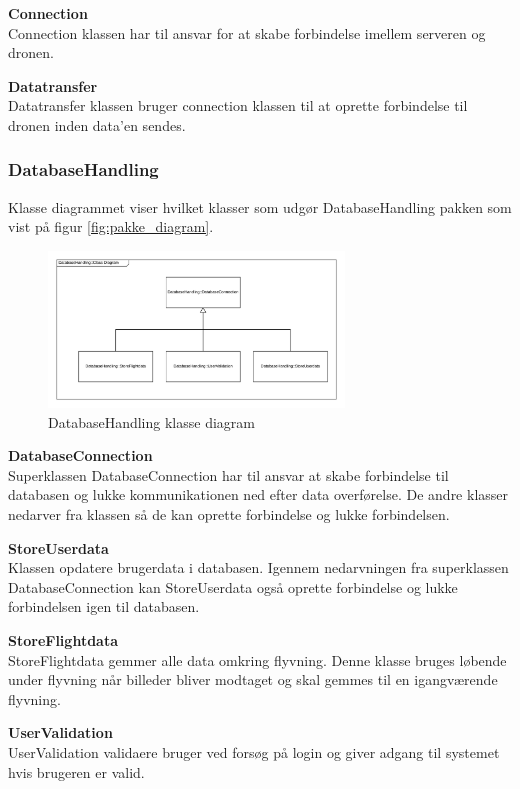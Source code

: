 \textbf{Connection}\\
Connection klassen har til ansvar for at skabe forbindelse imellem serveren og dronen.

\textbf{Datatransfer}\\
Datatransfer klassen bruger connection klassen til at oprette forbindelse til dronen inden data'en sendes. 

\newpage
\subsubsection*{DatabaseHandling}
Klasse diagrammet viser hvilket klasser som udgør DatabaseHandling pakken som vist på figur \ref{fig:pakke_diagram}.

\vspace{-5pt}
\begin{figure}[H]
	\centering
	\includegraphics[width=0.7\textwidth]{Billeder/klasse_diagrammer/DatabaseHandling.png}
	\vspace{-5pt}
	\caption{DatabaseHandling klasse diagram}
	\label{fig:DatabaseHandling_klasse_diagram}
\end{figure}

\textbf{DatabaseConnection}\\
Superklassen DatabaseConnection har til ansvar at skabe forbindelse til databasen og lukke kommunikationen ned efter data overførelse. De andre klasser nedarver fra klassen så de kan oprette forbindelse og lukke forbindelsen.

\textbf{StoreUserdata}\\
Klassen opdatere brugerdata i databasen. Igennem nedarvningen fra superklassen DatabaseConnection kan StoreUserdata også oprette forbindelse og lukke forbindelsen igen til databasen.

\textbf{StoreFlightdata}\\
StoreFlightdata gemmer alle data omkring flyvning. Denne klasse bruges løbende under flyvning når billeder bliver modtaget og skal gemmes til en igangværende flyvning.

\textbf{UserValidation}\\
UserValidation validaere bruger ved forsøg på login og giver adgang til systemet hvis brugeren er valid.
